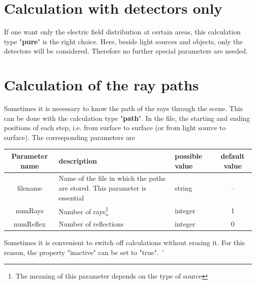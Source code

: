 \documentclass[a4paper,html,11pt,openany]{book}
\begin{document}
\section{Calculation with detectors only}
If one want only the electric field distribution at certain areas, this calculation type "\textbf{pure}" is the right choice. Here, beside light sources and objects, only the detectors will be considered. Therefore no further special parameters are needed. 
 \section{Calculation of the ray paths}
 Sometimes it is necessary to know the path of the rays through the scene. This can be done with the calculation type "{\bf path}". In the file, the starting and ending positions of each step, i.e. from surface to surface (or from light source to surface).
 The corresponding parameters are
 
 \vspace{1em}
 \begin{table}[h!]
\fontsize{10pt}{10pt}\selectfont
 \begin{tabular}{c|m{3cm}|m{3cm}|c}
  Parameter name & description  & possible value & default value \\
 \hline
 filename & Name of the file in which the paths are stored. This parameter is essential & string & -- \\
 \hline 
 numRays & Number of rays\footnote{The meaning of this parameter depends on the type of source} & integer & 1 \\
 \hline 
 numReflex & Number of reflections & integer & 0 \\
 \hline 
 \end{tabular}
   \end{table}
   Sometimes it is convenient to switch off calculations without erasing it. For this reason, the property "inactive" can be set to "true". ´ 
\end{document}
